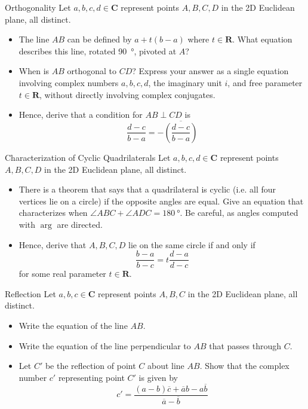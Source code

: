 \documentclass[12pt,letterpaper]{article}
\newcommand{\im}{i}
\begin{document}
\begin{problem}{Orthogonality}
  Let \(a,b,c,d\in\mathbf{C}\) represent points \(A, B, C, D\) in the 2D
  Euclidean plane, all distinct.

  \begin{itemize}
    \item The line \(AB\) can be defined by \(a + t(b-a)\) where
    \(t\in\mathbf{R}\). What equation describes this line, rotated
    \SI{90}{\degree}, pivoted at \(A\)?
    \item When is \(AB\) orthogonal to \(CD\)? Express your answer as a single
    equation involving complex numbers \(a, b, c, d\), the imaginary unit
    \(\im\), and free parameter \(t\in\mathbf{R}\), without directly involving
    complex conjugates.
    \item Hence, derive that a condition for \(AB \perp CD\) is \[
      \frac{d-c}{b-a} = -\overline{\left(\frac{d-c}{b-a}\right)}
    \]
  \end{itemize}
\end{problem}

\begin{problem}{Characterization of Cyclic Quadrilaterals}
  Let \(a,b,c,d\in\mathbf{C}\) represent points \(A, B, C, D\) in the 2D
  Euclidean plane, all distinct.

  \begin{itemize}
    \item There is a theorem that says that a quadrilateral is cyclic (i.e. all
    four vertices lie on a circle) if the opposite angles are equal. Give an
    equation that characterizes when \(\angle ABC + \angle ADC =
    \SI{180}{\degree}\). Be careful, as angles computed with \(\arg\) are
    directed.
    \item Hence, derive that \(A, B, C, D\) lie on the same circle if and only
    if \[
      \frac{b-a}{b-c} = t\frac{d-a}{d-c}
    \] for some real parameter \(t\in\mathbf{R}\).
  \end{itemize}
\end{problem}

\begin{problem}{Reflection}
  Let \(a, b, c\in\mathbf{C}\) represent points \(A, B, C\) in the 2D Euclidean
  plane, all distinct.

  \begin{itemize}
    \item Write the equation of the line \(AB\).
    \item Write the equation of the line perpendicular to \(AB\) that passes
    through \(C\).
    \item Let \(C'\) be the reflection of point \(C\) about line \(AB\). Show
    that the complex number \(c'\) representing point \(C'\) is given by \[
      c' = \frac{(a-b)\overline{c} + \overline{a}b -
      a\overline{b}}{\overline{a} - \overline{b}}
    \]
  \end{itemize}
\end{problem}
\end{document}
